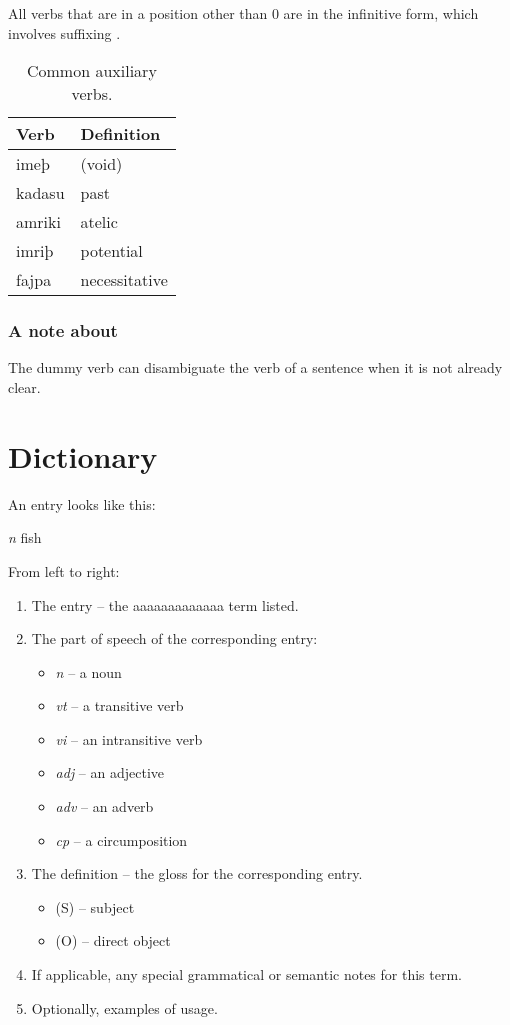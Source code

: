 \documentclass{book}
\newcommand{\lname}{aaaaaaaaaaaaa}
\begin{document}
All verbs that are in a position other than 0 are in the infinitive form, which involves suffixing .

\begin{table}
  \caption{Common auxiliary verbs.}
  \centering
  \begin{tabular}{ll}
    Verb & Definition \\
    \hline
    imeþ & (void) \\
    kadasu & past \\
    amriki & atelic \\
    imriþ & potential \\
    fajpa & necessitative \\
  \end{tabular}
\end{table}

\subsection{A note about }

The dummy verb  can disambiguate the verb of a sentence when it is not already clear.

\appendix

\chapter{Dictionary}

An entry looks like this:

 \textit{n}
\quad fish

From left to right:

\begin{enumerate}
    \item The entry -- the \lname{} term listed.
    \item The part of speech of the corresponding entry:
    \begin{itemize}
        \item \textit{n} -- a noun
        \item \textit{vt} -- a transitive verb
        \item \textit{vi} -- an intransitive verb
        \item \textit{adj} -- an adjective
        \item \textit{adv} -- an adverb
        \item \textit{cp} -- a circumposition
    \end{itemize}
    \item The definition -- the gloss for the corresponding entry.
    \begin{itemize}
        \item (S) -- subject
        \item (O) -- direct object
    \end{itemize}
    \item If applicable, any special grammatical or semantic notes for this term.
    \item Optionally, examples of usage.
\end{enumerate}

\begin{multicols}{2}
    
\end{multicols}
\end{document}
